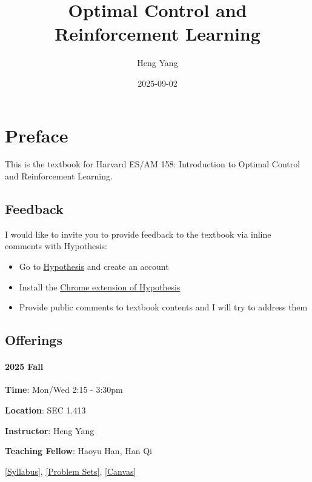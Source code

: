 \documentclass[
]{book}
\title{Optimal Control and Reinforcement Learning}
\author{Heng Yang}
\date{2025-09-02}
\theoremstyle{definition}
\theoremstyle{definition}
\theoremstyle{definition}
\theoremstyle{definition}
\theoremstyle{remark}
\begin{document}
\maketitle

{
\setcounter{tocdepth}{1}
\tableofcontents
}
\chapter*{Preface}\label{preface}

This is the textbook for Harvard ES/AM 158: Introduction to Optimal Control and Reinforcement Learning.

\section*{Feedback}\label{feedback}

I would like to invite you to provide feedback to the textbook via inline comments with Hypothesis:

\begin{itemize}
\item
  Go to \href{https://hypothes.is}{Hypothesis} and create an account
\item
  Install the \href{https://chrome.google.com/webstore/detail/hypothesis-web-pdf-annota/bjfhmglciegochdpefhhlphglcehbmek}{Chrome extension of Hypothesis}
\item
  Provide public comments to textbook contents and I will try to address them
\end{itemize}

\section*{Offerings}\label{offerings}

\subsubsection*{2025 Fall}\label{fall}

\textbf{Time}: Mon/Wed 2:15 - 3:30pm

\textbf{Location}: SEC 1.413

\textbf{Instructor}: Heng Yang

\textbf{Teaching Fellow}: Haoyu Han, Han Qi

\href{https://docs.google.com/document/d/1dIRYQZZJDx8K2q1TrodDDLg-bKJWWmj7o7yzOGlIs7o/edit?usp=sharing}{{[}Syllabus{]}}, \href{https://github.com/ComputationalRobotics/2025-ES-AM-158-PSET}{{[}Problem Sets{]}}, \href{https://canvas.harvard.edu/courses/153422}{{[}Canvas{]}}
\end{document}

